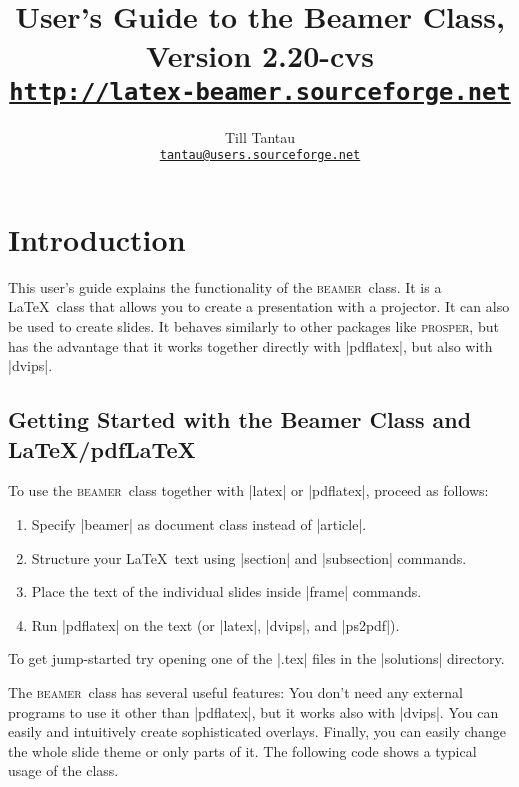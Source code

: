 \documentclass{ltxdoc}
\def\version{2.20-cvs}
\def\beamer{\textsc{beamer}}
\begin{document}
\title{User's Guide to the Beamer Class, Version \version\\
\Large\href{http://latex-beamer.sourceforge.net}{\texttt{http://latex-beamer.sourceforge.net}}}
\author{Till Tantau\\
  \href{mailto:tantau@users.sourceforge.net}{\texttt{tantau@users.sourceforge.net}}}

\maketitle

\tableofcontents

\section{Introduction}

This user's guide explains the functionality of the \beamer\ class.
It is a \LaTeX\ class that allows you to create a presentation with a
projector. It can also be used to create slides. It behaves 
similarly to other packages like \textsc{prosper}, but has the
advantage that it works together directly with |pdflatex|, but
also with |dvips|.

\subsection{Getting Started with the Beamer Class and \LaTeX/pdf\LaTeX}

To use the \beamer\ class together with |latex| or |pdflatex|, proceed
as follows: 
\begin{enumerate}
\item
  Specify |beamer| as document class instead of
  |article|.
\item
  Structure your \LaTeX\ text using |section| and
  |subsection| commands.
\item
  Place the text of the individual slides inside |frame|
  commands.
\item
  Run |pdflatex| on the text (or |latex|,
  |dvips|, and |ps2pdf|).
\end{enumerate}

To get jump-started try opening one of the |.tex| files in the
|solutions| directory.

The \beamer\ class has several useful features: You don't need any
external programs to use it other than |pdflatex|, but it works
also with |dvips|. You can easily and intuitively create
sophisticated overlays. Finally, you can easily change the whole slide
theme or only parts of it. The following code shows a typical usage of
the class.
\end{document}
